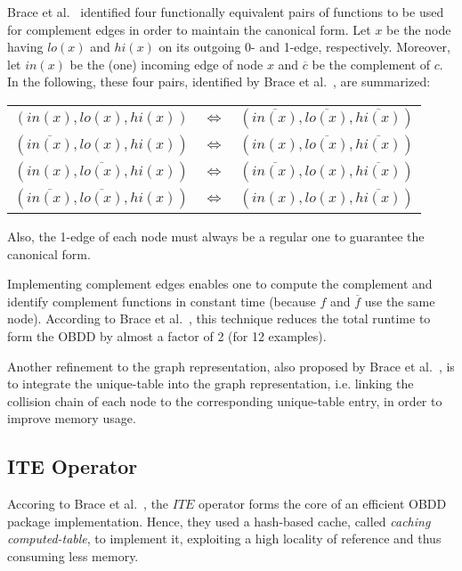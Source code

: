 \documentclass{vldb}
\begin{document}
Brace et al.~\cite{BRACE90} identified four functionally equivalent pairs of
functions to be used for complement edges in order to maintain the canonical form.
Let $x$ be the node having $lo(x)$ and $hi(x)$ on its outgoing 0- and 1-edge,
respectively. Moreover, let $in(x)$ be the (one) incoming edge of node $x$ and
$\overline{c}$ be the complement of $c$. In the following, these four pairs,
identified by Brace et al.~\cite{BRACE90}, are summarized:

\begin{center}
    \begin{tabular}{lll}
        $\left(in(x), lo(x), hi(x)\right)$ & $\Leftrightarrow$ & $\left(\overline{in(x)}, \overline{lo(x)}, \overline{hi(x)}\right)$ \tabularnewline
        $\left(\overline{in(x)}, lo(x), hi(x)\right)$ & $\Leftrightarrow$ & $\left(in(x), \overline{lo(x)}, \overline{hi(x)}\right)$ \tabularnewline
        $\left(in(x), \overline{lo(x)}, hi(x)\right)$ & $\Leftrightarrow$ & $\left(\overline{in(x)}, lo(x), \overline{hi(x)}\right)$ \tabularnewline
        $\left(\overline{in(x)}, \overline{lo(x)}, hi(x)\right)$ & $\Leftrightarrow$ & $\left(in(x), lo(x), \overline{hi(x)}\right)$ \tabularnewline
    \end{tabular}
\end{center}

Also, the 1-edge of each node must always be a regular one to guarantee the
canonical form.

Implementing complement edges enables one to compute the complement and identify
complement functions in constant time (because $f$ and $\overline{f}$ use the same
node). According to Brace et al.~\cite{BRACE90}, this technique reduces the total
runtime to form the OBDD by almost a factor of 2 (for 12 examples).

Another refinement to the graph representation, also proposed by Brace et
al.~\cite{BRACE90}, is to integrate the unique-table into the graph representation,
i.e. linking the collision chain of each node to the corresponding unique-table
entry, in order to improve memory usage.

\subsection{ITE Operator}
\label{subsec:ite-operator}

Accoring to Brace et al.~\cite{BRACE90}, the $ITE$ operator forms the core of an
efficient OBDD package implementation. Hence, they used a hash-based cache, called
\textit{caching computed-table}, to implement it, exploiting a high locality of
reference and thus consuming less memory.
\end{document}
